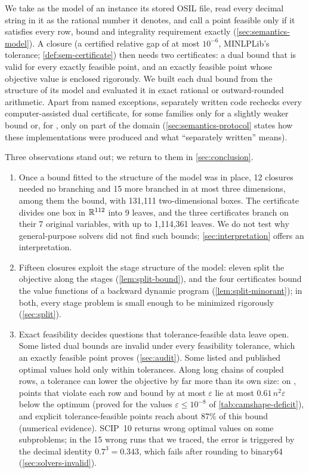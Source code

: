 We take as the model of an instance its stored OSIL file, read every decimal string in it as the rational number it denotes, and call a point feasible only if it satisfies every row, bound and integrality requirement exactly (\cref{sec:semantics-model}).
A closure (a certified relative gap of at most $10^{-6}$, MINLPLib's tolerance; \cref{def:sem-certificate}) then needs two certificates: a dual bound that is valid for every exactly feasible point, and an exactly feasible point whose objective value is enclosed rigorously.
We built each dual bound from the structure of its model and evaluated it in exact rational or outward-rounded arithmetic.
Apart from named exceptions, separately written code rechecks every computer-assisted dual certificate, for some families only for a slightly weaker bound or, for , only on part of the domain (\cref{sec:semantics-protocol} states how these implementations were produced and what ``separately written'' means).

Three observations stand out; we return to them in \cref{sec:conclusion}.
\begin{enumerate}
\item Once a bound fitted to the structure of the model was in place, 12 closures needed no branching and 15 more branched in at most three dimensions, among them the  bound, with 131,111 two-dimensional boxes.
  The  certificate divides one box in $\mathbb{R}^{112}$ into 9 leaves, and the three  certificates branch on their 7 original variables, with up to 1,114,361 leaves.
  We do not test why general-purpose solvers did not find such bounds; \cref{sec:interpretation} offers an interpretation.
\item Fifteen closures exploit the stage structure of the model: eleven split the objective along the stages (\cref{lem:split-bound}), and the four  certificates bound the value functions of a backward dynamic program (\cref{lem:split-minorant}); in both, every stage problem is small enough to be minimized rigorously (\cref{sec:split}).
\item Exact feasibility decides questions that tolerance-feasible data leave open.
  Some listed dual bounds are invalid under every feasibility tolerance, which an exactly feasible point proves (\cref{sec:audit}).
  Some listed and published optimal values hold only within tolerances.
  Along long chains of coupled rows, a tolerance can lower the objective by far more than its own size: on , points that violate each row and bound by at most $\varepsilon$ lie at most $0.61\,n^2\varepsilon$ below the optimum (proved for the values $\varepsilon\le10^{-8}$ of \cref{tab:camshape-deficit}), and explicit tolerance-feasible points reach about 87\% of this bound (numerical evidence).
  SCIP~10 returns wrong optimal values on some subproblems; in the 15 wrong runs that we traced, the error is triggered by the decimal identity $0.7^3=0.343$, which fails after rounding to binary64 (\cref{sec:solvers-invalid}).
\end{enumerate}

